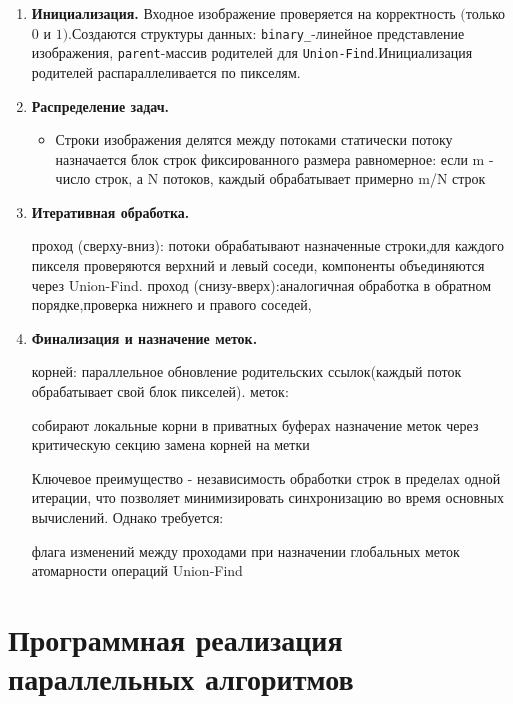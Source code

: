\documentclass[12pt]{extarticle}
\begin{document}
\begin{enumerate}
    \item \textbf{Инициализация.} 
    Входное изображение проверяется на корректность $($только $0$ и $1)$.Создаются структуры данных:  \texttt{binary\_}-линейное представление изображения, \texttt{parent}-массив родителей для \texttt{Union-Find}.Инициализация родителей распараллеливается по пикселям.
    \item \textbf{Распределение задач.} 
    \begin{itemize}
        \item Строки изображения делятся между потоками статически
         потоку назначается блок строк фиксированного размера
         равномерное: если m - число строк, а N потоков, каждый обрабатывает примерно m/N строк
    \end{itemize}
    \item \textbf{Итеративная обработка.} 
    \begin{itemize}
     проход (сверху-вниз): потоки обрабатывают назначенные строки,для каждого пикселя проверяются верхний и левый соседи, компоненты объединяются через Union-Find.
     проход (снизу-вверх):аналогичная обработка в обратном порядке,проверка нижнего и правого соседей,
    \end{itemize}
    \item \textbf{Финализация и назначение меток.} 
    \begin{itemize}
     корней: параллельное обновление родительских ссылок(каждый поток обрабатывает свой блок пикселей).
     меток:\begin{itemize}
     собирают локальные корни в приватных буферах
     назначение меток через критическую секцию
     замена корней на метки
    \end{itemize}
    \end{itemize}
    Ключевое преимущество - независимость обработки строк в пределах одной итерации, что позволяет минимизировать синхронизацию во время основных вычислений. Однако требуется:
\begin{itemize}
 флага изменений между проходами
 при назначении глобальных меток
 атомарности операций Union-Find
\end{itemize}
\end{enumerate}

\section{Программная реализация параллельных алгоритмов}
\end{document}
